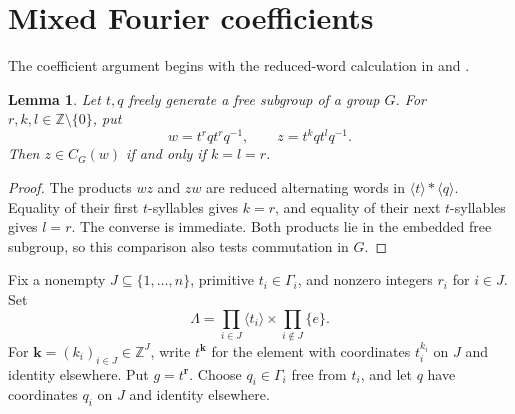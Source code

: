 \documentclass[11pt,letterpaper]{amsart}
\numberwithin{equation}{section}
\newtheorem{lemma}[theorem]{Lemma}
\theoremstyle{definition}
\theoremstyle{remark}
\newcommand{\Z}{\mathbb Z}
\begin{document}
\section{Mixed Fourier coefficients}\label{sec:coefficients}

The coefficient argument begins with the reduced-word calculation in
\cite[Lemma~2.3]{AJ} and \cite[Lemma~6.6]{FOT}.

\begin{lemma}\label{lem:words}
Let $t,q$ freely generate a free subgroup of a group $G$.
For $r,k,l\in\Z\setminus\{0\}$, put
\[
 w=t^rqt^rq^{-1},\qquad z=t^kqt^lq^{-1}.
\]
Then $z\in C_G(w)$ if and only if $k=l=r$.
\end{lemma}
\begin{proof}
The products $wz$ and $zw$ are reduced alternating words in
$\langle t\rangle*\langle q\rangle$. Equality of their first
$t$-syllables gives $k=r$, and equality of their next $t$-syllables
gives $l=r$. The converse is immediate.
Both products lie in the embedded free subgroup, so this comparison
also tests commutation in $G$.
\end{proof}

Fix a nonempty $J\subseteq\{1,\ldots,n\}$, primitive $t_i\in\Gamma_i$,
and nonzero integers $r_i$ for $i\in J$. Set
\[
 \Lambda=\prod_{i\in J}\langle t_i\rangle
                \times\prod_{i\notin J}\{e\}.
\]
For $\boldsymbol k=(k_i)_{i\in J}\in\Z^J$, write $t^{\boldsymbol k}$
for the element with coordinates $t_i^{k_i}$ on $J$ and identity
elsewhere. Put $g=t^{\boldsymbol r}$.
Choose $q_i\in\Gamma_i$ free from $t_i$, and let $q$ have coordinates
$q_i$ on $J$ and identity elsewhere.
\end{document}
